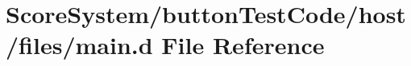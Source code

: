 \hypertarget{button_test_code_2host_2files_2main_8d}{}\section{Score\+System/button\+Test\+Code/host/files/main.d File Reference}
\label{button_test_code_2host_2files_2main_8d}
